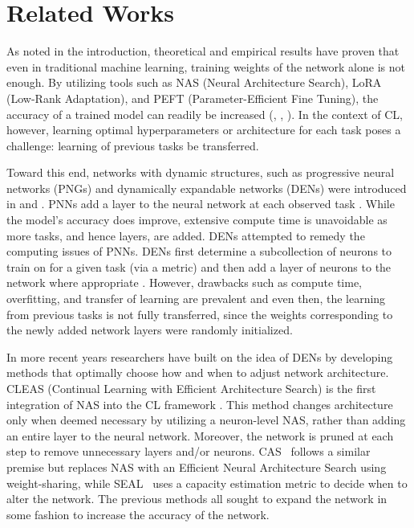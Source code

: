 \section{Related Works}\label{sec:related}
As noted in the introduction, theoretical and empirical results have proven that even in traditional machine learning, training weights of the network alone is not enough. By utilizing tools such as NAS (Neural Architecture Search), LoRA (Low-Rank Adaptation), and PEFT (Parameter-Efficient Fine Tuning), the accuracy of a trained model can readily be increased (\cite{liu2021survey}, \cite{LORAhu2022lora},  \cite{han2024parameter}). In the context of CL, however, learning optimal hyperparameters or architecture for each task poses a challenge: 
learning of previous tasks be transferred.

Toward this end, networks with dynamic structures, such as progressive neural networks (PNGs) and dynamically expandable networks (DENs) were introduced in \cite{rusu2016progressive} and \cite{yoon2017lifelong}. 
PNNs add a layer to the neural network at each observed task \cite{rusu2016progressive}. While the model's accuracy does improve, extensive compute time is unavoidable as more tasks, and hence layers, are added. DENs attempted to remedy the computing issues of PNNs. DENs first determine a subcollection of neurons to train on for a given task (via a metric) and then add a layer of neurons to the network where appropriate \cite{yoon2017lifelong}. However, drawbacks such as compute time, overfitting, and transfer of learning are prevalent and even then, the learning from previous tasks is not fully transferred, since the weights corresponding to the newly added network layers were randomly initialized. 

In more recent years researchers have built on the idea of DENs by developing methods that optimally choose how and when to adjust network architecture. CLEAS (Continual Learning with Efficient Architecture Search) is the first integration of NAS into the CL framework \cite{CLEASgao2022CLEAS}. This method  changes architecture only  when deemed necessary by utilizing a neuron-level NAS, rather than adding an entire layer to the neural network. Moreover, the network is pruned at each step to remove unnecessary layers and/or neurons. 
CAS~\cite{CASpasunuru2019continual} follows a similar premise but replaces NAS with an Efficient Neural Architecture Search using weight-sharing, while SEAL~\cite{SEALgambella2025SEAL} uses a capacity estimation metric to decide when to alter the network. The previous methods all sought to expand the network in some fashion to increase the accuracy of the network.

